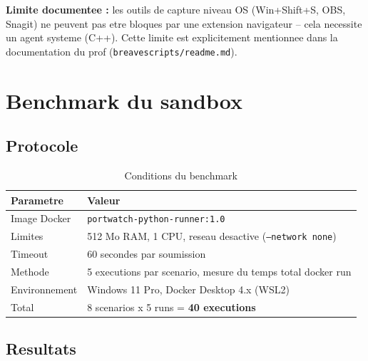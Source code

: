 \documentclass[12pt,a4paper]{article}
\begin{document}
\noindent\colorbox{myblue!10}{\parbox{\linewidth}{\vspace{4pt}
\textbf{Limite documentee :} les outils de capture niveau OS (Win+Shift+S, OBS, Snagit)
ne peuvent pas etre bloques par une extension navigateur -- cela necessite un agent
systeme (C++). Cette limite est explicitement mentionnee dans la documentation
du prof (\texttt{breavescripts/readme.md}).
\vspace{4pt}}}

\section{Benchmark du sandbox}

\subsection{Protocole}

\begin{table}[H]
\centering
\caption{Conditions du benchmark}
\begin{tabularx}{\textwidth}{@{}lX@{}}
\toprule
Parametre & Valeur \\
\midrule
Image Docker   & \texttt{portwatch-python-runner:1.0} \\
Limites        & 512 Mo RAM, 1 CPU, reseau desactive (\texttt{--network none}) \\
Timeout        & 60 secondes par soumission \\
Methode        & 5 executions par scenario, mesure du temps total docker run \\
Environnement  & Windows 11 Pro, Docker Desktop 4.x (WSL2) \\
Total          & 8 scenarios x 5 runs = \textbf{40 executions} \\
\bottomrule
\end{tabularx}
\end{table}

\subsection{Resultats}
\end{document}
